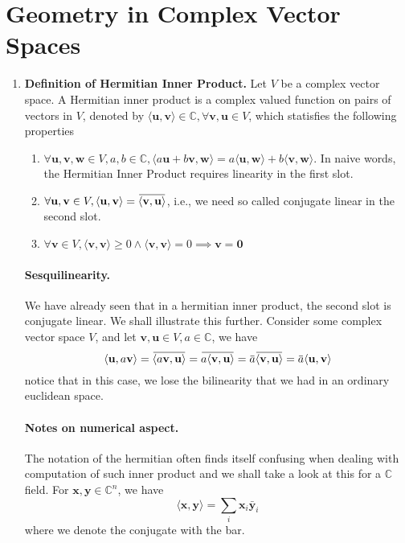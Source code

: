 \documentclass[oneside, 12pt]{book}
\newcommand{\settag}[1]{\renewcommand{\theenumi}{#1}}
\newcommand{\complex}{\mathbb{C}}
\newcommand{\tbf}[1]{\textbf{#1}}
\newcommand{\overbar}[1]{\mkern 1.5mu\overline{\mkern-1.5mu#1\mkern-1.5mu}\mkern 1.5mu}
\newcommand{\para}[1]{\item \tbf{#1}}
\newcommand{\vv}{\mathbf{v}}
\newcommand{\vu}{\mathbf{u}}
\newcommand{\vw}{\mathbf{w}}
\newcommand{\vx}{\mathbf{x}}
\newcommand{\vy}{\mathbf{y}}
\newcommand{\vzero}{\mathbf{0}}
\begin{document}
\section{Geometry in Complex Vector Spaces}
\begin{enumerate}
    \settag{5.3.1}
    \para{Definition of Hermitian Inner Product.} Let $V$ be a complex vector space. A Hermitian
    inner product is a complex valued function on pairs of vectors in $V$, denoted by $\langle \vu, \vv\rangle\in \complex, \forall \vv,\vu \in V$,
    which statisfies the following properties
    \begin{enumerate}
        \item $\forall \vu, \vv, \vw\in V, a, b\in \complex, \langle a\vu+b\vv,\vw\rangle = a\langle \vu,\vw\rangle + b\langle \vv,\vw\rangle$. In naive words, 
        the Hermitian Inner Product requires linearity in the first slot.
        \item $\forall \vu, \vv\in V, \langle \vu, \vv \rangle = \overbar{\langle \vv, \vu \rangle}$, i.e., we need so called conjugate linear in the second slot. 
        \item $\forall \vv\in V,\langle \vv,\vv \rangle \geq 0 \land \langle \vv,\vv\rangle =0 \implies \vv = \vzero$
    \end{enumerate}
    \paragraph{Sesquilinearity.} We have already seen that in a hermitian inner product, the second slot is conjugate linear. We shall illustrate this further.
    Consider some complex vector space $V$, and let $\vv,\vu\in V, a\in \complex$, we have
    \begin{equation*}
        \langle \vu,a\vv \rangle = \overbar{\langle a\vv,\vu\rangle} = \overbar{a\langle \vv,\vu \rangle} = \overbar{a}\overbar{\langle \vv,\vu\rangle} = \overbar{a}\langle \vu,\vv\rangle
    \end{equation*}
    notice that in this case, we lose the bilinearity that we had in an ordinary euclidean space.
    \paragraph{Notes on numerical aspect.} The notation of the hermitian often finds itself confusing when dealing with
    computation of such inner product and we shall take a look at this for a $\complex$ field. For $\vx,\vy\in \complex^n$, we have
    \begin{equation*}
        \langle \vx ,\vy \rangle = \sum_i \vx_i\bar{\vy}_i
    \end{equation*}
    where we denote the conjugate with the bar.


\end{enumerate}
\end{document}
